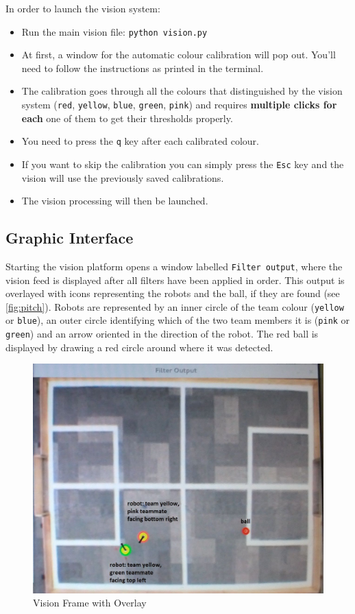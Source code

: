 In order to launch the vision system:
\begin{itemize}
\item Run the main vision file: \texttt{python vision.py}
\item At first, a window for the automatic colour calibration will pop out. You'll need to follow the instructions as printed in the terminal. 
\item The calibration goes through all the colours that distinguished by the vision system (\texttt{red}, \texttt{yellow}, \texttt{blue}, \texttt{green}, \texttt{pink}) and requires \textbf{multiple clicks for each} one of them to get their thresholds properly.
\item You need to press the \texttt{q} key after each calibrated colour. 
\item If you want to skip the calibration you can simply press the \texttt{Esc} key and the vision will use the previously saved calibrations.
\item The vision processing will then be launched.
\end{itemize}

\subsection{Graphic Interface}
Starting the vision platform opens a window labelled \texttt{Filter output}, where the vision feed is displayed after all filters have been applied in order. This output is overlayed with icons representing the robots and the ball, if they are found (see \autoref{fig:pitch}). Robots are represented by an inner circle of the team colour (\texttt{yellow} or \texttt{blue}), an outer circle identifying which of the two team members it is (\texttt{pink} or \texttt{green}) and an arrow oriented in the direction of the robot.  The red ball is displayed by drawing a red circle around where it was detected. 

\begin{figure}[H]
\centering
\includegraphics[scale=0.2]{vision_pitch}
\caption{Vision Frame with Overlay}
\label{fig:pitch}
\end{figure}

